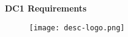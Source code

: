 \documentclass[12pt]{report}
\newcommand{\docheader}{{DC1 Requirements}}
\begin{document}
\pagestyle{empty}

\vspace*{0.3\textheight}

\begin{center}
{\Huge\bfseries \docheader}
\end{center}

\begin{figure}[!b]
\centering\texttt{[image: desc-logo.png]}
\end{figure}

\clearpage
\maketoc
\label{toc}

\pagestyle{fancy}
\fancyfoot{} %
\fancyfoot[R]{\thepage}  %

\fancyhead[L]{}
\fancyhead[R]{\descheader}
\renewcommand{\footrulewidth}{1pt}











% 

% 




\end{document}
